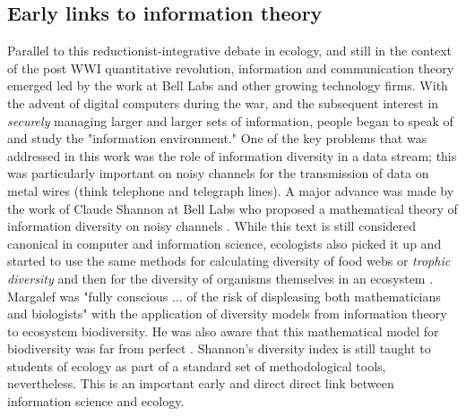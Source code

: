 \subsection{Early links to information theory}

Parallel to this reductionist-integrative debate in ecology, and still in the context of the post WWI quantitative revolution, information and communication theory emerged led by the work at Bell Labs and other growing technology firms. With the advent of digital computers during the war, and the subsequent interest in \textit{securely} managing larger and larger sets of information, people began to speak of and study the "information environment." One of the key problems that was addressed in this work was the role of information diversity in a data stream; this was particularly important on noisy channels for the transmission of data on metal wires (think telephone and telegraph lines). A major advance was made by the work of Claude Shannon at Bell Labs who proposed a mathematical theory of information diversity on noisy channels \citep{shannon_1948}. While this text is still considered canonical in computer and information science, ecologists also picked it up and started to use the same methods for calculating diversity of food webs or \textit{trophic diversity} \citep{macarthur_1955} and then for the diversity of organisms themselves in an ecosystem \citep{margalef_1957}. Margalef was "fully conscious ... of the risk of displeasing both mathematicians and biologists" with the application of diversity models from information theory to ecosystem biodiversity. He was also aware that this mathematical model for biodiversity was far from perfect \citep{margalef_1957}. Shannon's diversity index is still taught to students of ecology as part of a standard set of methodological tools, nevertheless. This is an important early and direct direct link between information science and ecology.

